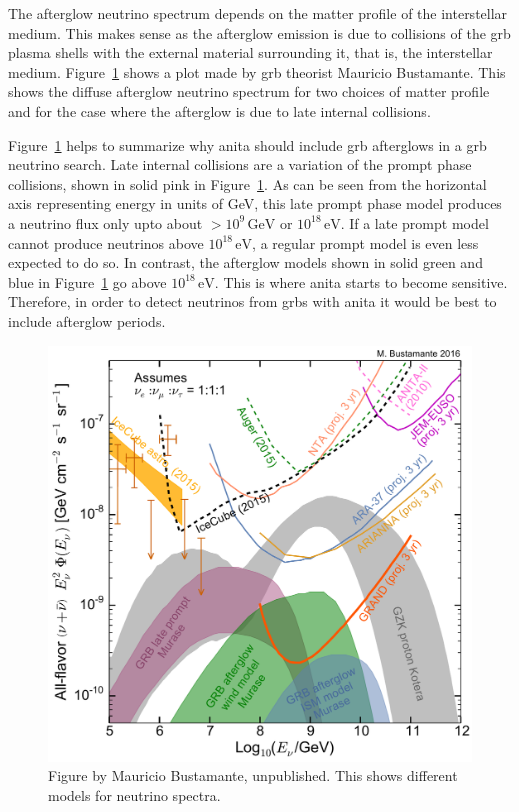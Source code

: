 The afterglow neutrino spectrum depends on the matter profile of the interstellar medium. This makes sense as the afterglow emission is due to collisions of the \gls{grb} plasma shells with the external material surrounding it, that is, the interstellar medium. Figure~\ref{mauricio} shows a plot made by \gls{grb} theorist Mauricio Bustamante. This shows the diffuse afterglow neutrino spectrum for two choices of matter profile and for the case where the afterglow is due to late internal collisions. 

Figure~\ref{mauricio} helps to summarize why \gls{anita} should include \gls{grb} afterglows in a \gls{grb} neutrino search. 
Late internal collisions are a variation of the prompt phase collisions, shown in solid pink in Figure~\ref{mauricio}. As can be seen from the horizontal axis representing energy in units of GeV, this late prompt phase model produces a neutrino flux only upto about $>10^{9}\,\mbox{GeV}$ or $10^{18}\,\mbox{eV}$. If a late prompt model cannot produce neutrinos above $10^{18}\,\mbox{eV}$, a regular prompt model is even less expected to do so. In contrast, the afterglow models shown in solid green and blue in Figure~\ref{mauricio} go above $10^{18}\,\mbox{eV}$. This is where \gls{anita} starts to become sensitive. Therefore, in order to detect neutrinos from \gls{grbs} with \gls{anita} it would be best to include afterglow periods. 

\begin{figure}
\centering
\includegraphics[width=1.0\textwidth]{figures/mauricio_plot.pdf}
\caption{Figure by Mauricio Bustamante, unpublished. This shows different models for neutrino spectra.}
\label{mauricio}
\end{figure}